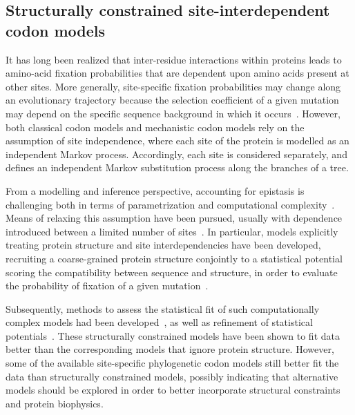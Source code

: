 \subsection{Structurally constrained site-interdependent codon models}
\label{subsec:structurally-constrained-site-interdependent-codon-models}

It has long been realized that inter-residue interactions within proteins leads to amino-acid fixation probabilities that are dependent upon amino acids present at other sites.
More generally, site-specific fixation probabilities may change along an evolutionary trajectory because the selection coefficient of a given mutation may depend on the specific sequence background in which it occurs~\citep{Goldstein2016}.
However, both classical \gls{codon} models and mechanistic \gls{codon} models rely on the assumption of site independence, where each site of the protein is modelled as an independent Markov process.
Accordingly, each site is considered separately, and defines an independent Markov \gls{substitution} process along the branches of a tree.

From a modelling and inference perspective, accounting for epistasis is challenging both in terms of parametrization and computational complexity~\citep{Manhart2014}.
Means of relaxing this assumption have been pursued, usually with dependence introduced between a limited number of sites~\citep{Felsenstein1996}.
In particular, models explicitly treating protein structure and site interdependencies have been developed, recruiting a coarse-grained protein structure conjointly to a statistical potential scoring the compatibility between sequence and structure, in order to evaluate the probability of fixation of a given mutation~\citep{Robinson2003, Rodrigue2005}.

Subsequently, methods to assess the statistical fit of such computationally complex models had been developed~\citep{Rodrigue2009}, as well as refinement of statistical potentials~\citep{Kleinman2010}.
These structurally constrained models have been shown to fit data better than the corresponding models that ignore protein structure.
However, some of the available site-specific phylogenetic \gls{codon} models still better fit the data than structurally constrained models, possibly indicating that alternative models should be explored in order to better incorporate structural constraints and protein biophysics.

